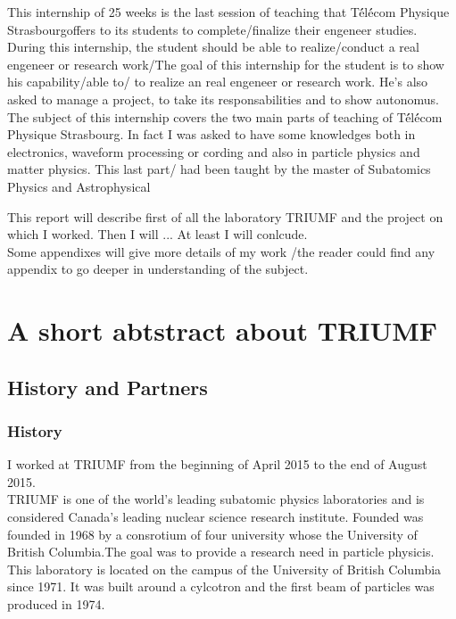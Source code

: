 \documentclass[a4paper, 11pt]{report}%
\newcommand{\TPS}{T\'él\'écom Physique Strasbourg}
\begin{document}
  This internship of 25 weeks is the last session of teaching that \TPS offers to its students to complete/finalize their 
  engeneer studies. During this internship, the student should be able to realize/conduct a real engeneer or research work/The goal of this internship for the student is to show his 
  capability/able to/ to realize an real engeneer or research 
  work. 
  He's also asked to manage a project, to take its responsabilities and to show autonomus. 
  \\

  The subject of this internship covers the two main parts of teaching of \TPS. In fact I was asked to have some knowledges both in electronics, 
  waveform processing or cording and also in particle physics and matter physics. This last part/ had been taught by the master of Subatomics Physics
  and Astrophysical 
  
  This report will describe first of all the laboratory TRIUMF and the project on which I worked. Then I will ...
  At least I will conlcude. 
  \\
  
  Some appendixes will give more details of my work /the reader could find any appendix to go deeper in understanding of the subject.
  


\chapter{A short abtstract about TRIUMF}


  \section{History and Partners}

  \subsection{History}

  I worked at TRIUMF from the beginning of April 2015 to the end of August 2015.
  \\
  
  TRIUMF is one of the world’s leading subatomic physics laboratories and is considered Canada's leading nuclear science research institute. 
  Founded was founded in 1968 by a consrotium of four university whose the University of British Columbia.The goal was to provide a research 
  need in particle physicis. This laboratory is located on the campus of the University of British Columbia since 1971. It was built around 
  a cylcotron and the first beam of particles was produced in 1974.
  
\end{document}
